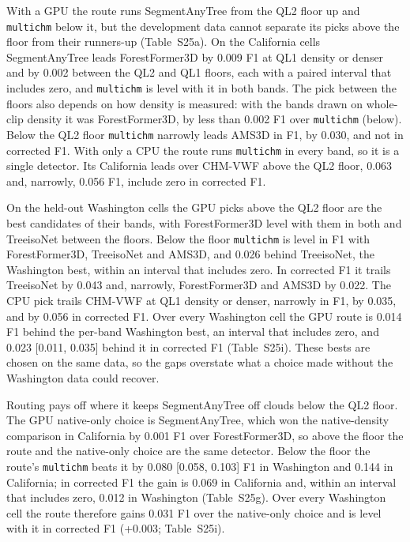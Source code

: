 \documentclass[10pt,a4paper]{article}
\begin{document}
With a GPU the route runs SegmentAnyTree from the QL2 floor up and \texttt{multichm}
below it, but the development data cannot separate its picks above the floor
from their runners-up (Table~S25a). On the California cells SegmentAnyTree leads
ForestFormer3D by 0.009 F1 at QL1 density or denser and by 0.002 between the QL2
and QL1 floors, each with a paired interval that includes zero, and \texttt{multichm}
is level with it in both bands. The pick between the floors also depends on how
density is measured: with the bands drawn on whole-clip density it was
ForestFormer3D, by less than 0.002 F1 over \texttt{multichm} (below). Below the
QL2 floor \texttt{multichm} narrowly leads AMS3D in F1, by 0.030, and not in corrected
F1. With only a CPU the route runs \texttt{multichm} in every band, so it is a single
detector. Its California leads over CHM-VWF above the QL2 floor, 0.063 and,
narrowly, 0.056 F1, include zero in corrected F1.

On the held-out Washington cells the GPU picks above the QL2 floor are the best
candidates of their bands, with ForestFormer3D level with them in both and
TreeisoNet between the floors. Below the floor \texttt{multichm} is level in F1 with
ForestFormer3D, TreeisoNet and AMS3D, and 0.026 behind TreeisoNet, the
Washington best, within an interval that includes zero. In corrected F1 it
trails TreeisoNet by 0.043 and, narrowly, ForestFormer3D and AMS3D by 0.022. The
CPU pick trails CHM-VWF at QL1 density or denser, narrowly in F1, by 0.035, and
by 0.056 in corrected F1. Over every Washington cell the GPU route is 0.014 F1
behind the per-band Washington best, an interval that includes zero, and 0.023
[0.011, 0.035] behind it in corrected F1 (Table~S25i). These bests are chosen on
the same data, so the gaps overstate what a choice made without the Washington
data could recover.

Routing pays off where it keeps SegmentAnyTree off clouds below the QL2 floor.
The GPU native-only choice is SegmentAnyTree, which won the native-density
comparison in California by 0.001 F1 over ForestFormer3D, so above the floor the
route and the native-only choice are the same detector. Below the floor the
route's \texttt{multichm} beats it by 0.080 [0.058, 0.103] F1 in Washington and 0.144
in California; in corrected F1 the gain is 0.069 in California and, within an
interval that includes zero, 0.012 in Washington (Table~S25g). Over every
Washington cell the route therefore gains 0.031 F1 over the native-only choice
and is level with it in corrected F1 (+0.003; Table~S25i).
\end{document}
